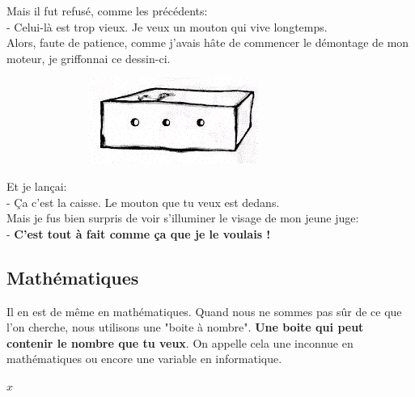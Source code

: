 \documentclass[12pt]{article}
\begin{document}
\begin{multicols}{2}
  Mais il fut refusé, comme les précédents: \\
  - Celui-là est trop vieux. Je veux un mouton qui vive longtemps. \\
  Alors, faute de patience, comme j'avais hâte de commencer le démontage de mon moteur, je griffonnai ce dessin-ci.
  
  \begin{figure}[H]
        \centering
        \includegraphics[width=0.5\linewidth]{4x5-calcul-litteral-1/sources/dm-mouton4.png}
  \end{figure}

  Et je lançai: \\
  - Ça c'est la caisse. Le mouton que tu veux est dedans. \\
  Mais je fus bien surpris de voir s'illuminer le visage de mon jeune juge: \\
  - \textbf{C'est tout à fait comme ça que je le voulais ! }
\end{multicols}

\subsection*{Mathématiques}

Il en est de même en mathématiques. Quand nous ne sommes pas sûr de ce que l’on cherche, nous utilisons une "boite à nombre". \textbf{Une boite qui peut contenir le nombre que tu veux}. On appelle cela une inconnue en mathématiques ou encore une variable en informatique. \\

\vspace{2cm}
\centerline{\fontsize{102}{102} $x$}
\end{document}
